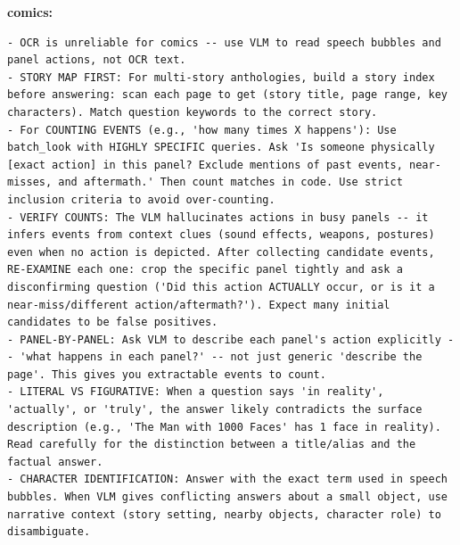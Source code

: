 \documentclass[10pt,twocolumn]{article}
\begin{document}
\textbf{comics:}
\begin{lstlisting}
- OCR is unreliable for comics -- use VLM to read speech bubbles and panel actions, not OCR text.
- STORY MAP FIRST: For multi-story anthologies, build a story index before answering: scan each page to get (story title, page range, key characters). Match question keywords to the correct story.
- For COUNTING EVENTS (e.g., 'how many times X happens'): Use batch_look with HIGHLY SPECIFIC queries. Ask 'Is someone physically [exact action] in this panel? Exclude mentions of past events, near-misses, and aftermath.' Then count matches in code. Use strict inclusion criteria to avoid over-counting.
- VERIFY COUNTS: The VLM hallucinates actions in busy panels -- it infers events from context clues (sound effects, weapons, postures) even when no action is depicted. After collecting candidate events, RE-EXAMINE each one: crop the specific panel tightly and ask a disconfirming question ('Did this action ACTUALLY occur, or is it a near-miss/different action/aftermath?'). Expect many initial candidates to be false positives.
- PANEL-BY-PANEL: Ask VLM to describe each panel's action explicitly -- 'what happens in each panel?' -- not just generic 'describe the page'. This gives you extractable events to count.
- LITERAL VS FIGURATIVE: When a question says 'in reality', 'actually', or 'truly', the answer likely contradicts the surface description (e.g., 'The Man with 1000 Faces' has 1 face in reality). Read carefully for the distinction between a title/alias and the factual answer.
- CHARACTER IDENTIFICATION: Answer with the exact term used in speech bubbles. When VLM gives conflicting answers about a small object, use narrative context (story setting, nearby objects, character role) to disambiguate.
\end{lstlisting}
\end{document}
